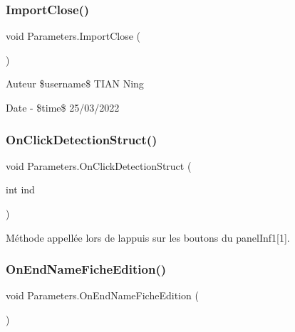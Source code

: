 \subsubsection{\texorpdfstring{Import\+Close()}{ImportClose()}}
{\footnotesize\ttfamily void Parameters.\+Import\+Close (\begin{DoxyParamCaption}{ }\end{DoxyParamCaption})\hspace{0.3cm}{\ttfamily [inline]}}

\begin{DoxyAuthor}{Auteur}
\$username\$ T\+I\+AN Ning 
\end{DoxyAuthor}
\begin{DoxyDate}{Date}
-\/ \$time\$ 25/03/2022 
\end{DoxyDate}
\mbox{\label{class_parameters_ad62219d943618c3b970a46239ae443ae}} 
\subsubsection{\texorpdfstring{On\+Click\+Detection\+Struct()}{OnClickDetectionStruct()}}
{\footnotesize\ttfamily void Parameters.\+On\+Click\+Detection\+Struct (\begin{DoxyParamCaption}\item[{int}]{ind }\end{DoxyParamCaption})\hspace{0.3cm}{\ttfamily [inline]}}



Méthode appellée lors de l\textquotesingle{}appuis sur les boutons du panel\+Inf1\mbox{[}1\mbox{]}. 

\mbox{\label{class_parameters_ad3db64cd1a228cb925a9afd7f32332a5}} 
\subsubsection{\texorpdfstring{On\+End\+Name\+Fiche\+Edition()}{OnEndNameFicheEdition()}}
{\footnotesize\ttfamily void Parameters.\+On\+End\+Name\+Fiche\+Edition (\begin{DoxyParamCaption}{ }\end{DoxyParamCaption})\hspace{0.3cm}{\ttfamily [inline]}}






